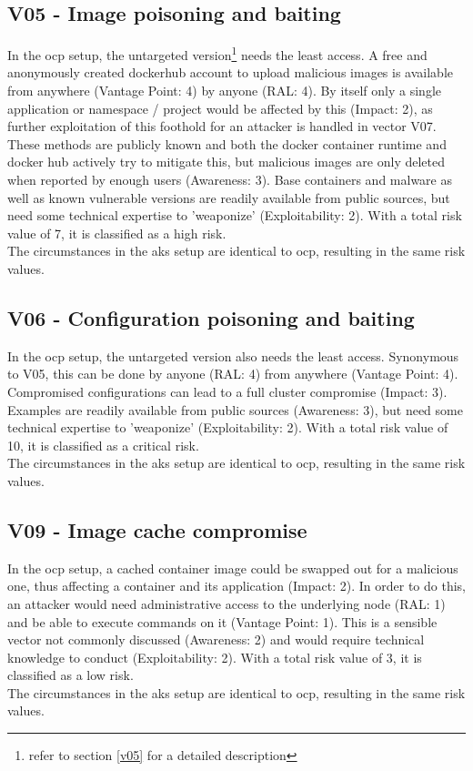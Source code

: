 \subsection{V05 - Image poisoning and baiting}

In the \gls{ocp} setup, the untargeted version\footnote{refer to section \ref{v05} for a detailed description} needs the least access. A free and anonymously created dockerhub account to upload malicious images is available from anywhere (Vantage Point: 4) by anyone (RAL: 4). By itself only a single application or namespace / project would be affected by this (Impact: 2), as further exploitation of this foothold for an attacker is handled in vector V07.
These methods are publicly known and both the docker container runtime and docker hub actively try to mitigate this, but malicious images are only deleted when reported by enough users (Awareness: 3).
Base containers and malware as well as known vulnerable versions are readily available from public sources, but need some technical expertise to 'weaponize' (Exploitability: 2).
With a total risk value of 7, it is classified as a high risk. \\
The circumstances in the \gls{aks} setup are identical to \gls{ocp}, resulting in the same risk values.

\subsection{V06 - Configuration poisoning and baiting}

In the \gls{ocp} setup, the untargeted version also needs the least access. Synonymous to V05, this can be done by anyone (RAL: 4) from anywhere (Vantage Point: 4).
Compromised configurations can lead to a full cluster compromise (Impact: 3).
Examples are readily available from public sources (Awareness: 3), but need some technical expertise to 'weaponize' (Exploitability: 2).
With a total risk value of 10, it is classified as a critical risk. \\
The circumstances in the \gls{aks} setup are identical to \gls{ocp}, resulting in the same risk values.


\subsection{V09 - Image cache compromise}

In the \gls{ocp} setup, a cached container image could be swapped out for a malicious one, thus affecting a container and its application (Impact: 2). In order to do this, an attacker would need administrative access to the underlying node (RAL: 1) and be able to execute commands on it (Vantage Point: 1). This is a sensible vector not commonly discussed (Awareness: 2) and would require technical knowledge to conduct (Exploitability: 2).
With a total risk value of 3, it is classified as a low risk. \\
The circumstances in the \gls{aks} setup are identical to \gls{ocp}, resulting in the same risk values.

